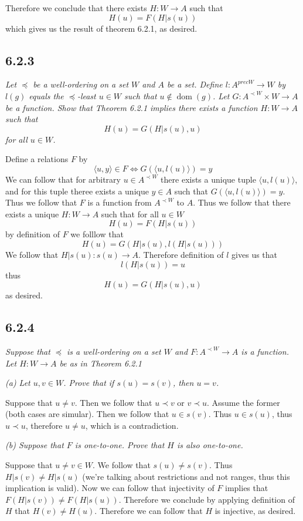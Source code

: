 \documentclass[11pt,oneside,titlepage]{book}
\DeclareMathOperator \lra {\Leftrightarrow}
\DeclareMathOperator \dom {dom}
\newcommand{\eangle}[1]{\langle #1 \rangle}
\begin{document}
Therefore we conclude that there exists $H: W \to A$ such that
$$H(u) = F(H|s(u))$$
which gives us the result of theorem 6.2.1, as desired.

\subsection*{6.2.3}

\textit{Let $\preceq$ be a well-ordering on a set $W$ and $A$ be a set.
  Define $l: A^{prec W} \to W$ by $l(g)$ equals the $\preceq$-least $u \in W$
  such that $u \notin \dom(g)$. Let $G: A^{\prec W} \times W \to A$ be a function.
  Show that Theorem 6.2.1 implies there exists a function $H: W \to A$ such that
  $$H(u) = G(H|s(u), u)$$
  for all $u \in W$.}

Define a relations $F$ by
$$\eangle{u, y} \in F \lra G(\eangle{u, l(u)}) = y$$
We can follow that for arbitrary $u \in A^{\prec W}$ there exists a unique tuple $\eangle{u, l(u)}$,
and for this tuple theree exists a unique $y \in A$ such that $G(\eangle{u, l(u)}) = y$.
Thus we follow that $F$ is a function from $A^{\prec W}$ to $A$.
Thus we follow that there exists a unique $H: W \to A$ such that for all $u \in W$
$$H(u) = F(H|s(u))$$
by definition of $F$ we folllow that
$$H(u) = G(H|s(u), l(H|s(u)))$$
We follow that $H|s(u): s(u) \to A$. Therefore definition of $l$ gives us that
$$l(H|s(u)) = u$$
thus
$$H(u) = G(H|s(u), u)$$
as desired.

\subsection*{6.2.4}

\textit{Suppose that $\preceq$ is a well-ordering on a set $W$ and $F: A^{\prec W} \to A$ is
  a function. Let $H: W \to A$ be as in Theorem 6.2.1}

\textit{(a) Let $u, v \in W$. Prove that if $s(u) = s(v)$, then $u = v$.}

Suppose that $u \neq v$. Then we follow that $u \prec v$ or $v \prec u$. Assume the former
(both cases are simular). Then we follow that $u \in s(v)$. Thus
$u \in s(u)$, thus $u \prec u$, therefore $u \neq u$, which is a contradiction.

\textit{(b) Suppose that $F$ is one-to-one. Prove that $H$ is also one-to-one.}

Suppose that $u \neq v \in W$. We follow that $s(u) \neq s(v)$. Thus $H|s(v) \neq H|s(u)$
(we're talking about restrictions and not ranges, thus this implication is valid). Now we
can follow that injectivity of $F$ implies that  $F(H|s(v)) \neq F(H|s(u))$. Therefore
we conclude by applying definition of $H$ that $H(v) \neq H(u)$. Therefore we can follow that
$H$ is injective, as desired.
\end{document}
